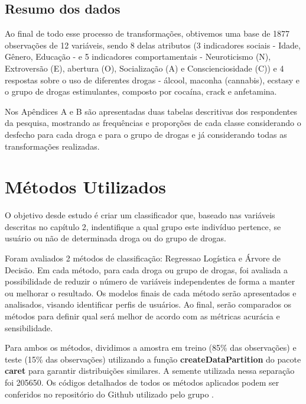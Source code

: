 \documentclass[
	article,			%
	11pt,				%
	oneside,			%
	a4paper,			%
	english,			%
	brazil,				%
	sumario=tradicional
	]{abntex2}
\begin{document}
\subsection{Resumo dos dados}

Ao final de todo esse processo de transformações, obtivemos uma base de 1877 observações de 12 variáveis, sendo 8 delas atributos (3 indicadores sociais - Idade, Gênero, Educação - e 5 indicadores comportamentais - Neuroticismo (N), Extroversão (E), abertura (O), Socialização (A) e Conscienciosidade (C)) e 4 respostas sobre o uso de diferentes drogas - álcool, maconha (cannabis), ecstasy e o grupo de drogas estimulantes, composto por cocaína, crack e anfetamina.

Nos Apêndices A e B são apresentadas duas tabelas descritivas dos respondentes da pesquisa, mostrando as frequências e proporções de cada classe considerando o desfecho para cada droga e para o grupo de drogas e já considerando todas as transformações realizadas.




\section{Métodos Utilizados}

O objetivo desde estudo é criar um classificador que, baseado nas variáveis descritas no capítulo 2, indentifique a qual grupo este indivíduo pertence, se usuário ou não de determinada droga ou do grupo de drogas.

Foram avaliados 2 métodos de classificação: Regressao Logística e Árvore de Decisão. 
Em cada método, para cada droga ou grupo de drogas, foi avaliada a possibilidade de reduzir o número de variáveis independentes de forma a manter ou melhorar o resultado. Os modelos finais de cada método serão apresentados e analisados, visando identificar perfis de usuários. Ao final, serão comparados os métodos para definir qual será melhor de acordo com as métricas acurácia e sensibilidade. 

Para ambos os métodos, dividimos a amostra em treino (85\% das observações) e teste (15\% das observações) utilizando a função \textbf{createDataPartition} do pacote \textbf{caret} para garantir distribuições similares. A semente utilizada nessa separação foi 205650. Os códigos detalhados de todos os métodos aplicados podem ser conferidos no repositório do Github utilizado pelo grupo \cite{github}.
\end{document}
